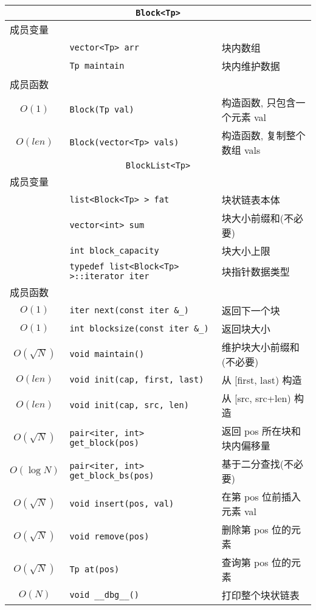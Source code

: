 \begin{longtable}{c|l|l}
\multicolumn{3}{c}{{\tt Block<Tp>}} \\ \hline\hline
\multicolumn{3}{l}{成员变量} \\ \hline
& \verb`vector<Tp> arr` & 块内数组 \\
& \verb`Tp maintain` & 块内维护数据 \\
\hline
\multicolumn{3}{l}{成员函数} \\ \hline
$O(1)$ & \verb`Block(Tp val)` & 构造函数, 只包含一个元素 val \\
$O(len)$ & \verb`Block(vector<Tp> vals)` & 构造函数, 复制整个数组 vals \\
\hline\hline
\multicolumn{3}{c}{{\tt BlockList<Tp>}}\\ \hline\hline
\multicolumn{3}{l}{成员变量} \\ \hline
& \verb`list<Block<Tp> > fat` & 块状链表本体 \\
& \verb`vector<int> sum` & 块大小前缀和(不必要) \\
& \verb`int block_capacity` & 块大小上限 \\
& \verb`typedef list<Block<Tp> >::iterator iter` & 块指针数据类型 \\
\hline
\multicolumn{3}{l}{成员函数} \\ \hline
$O(1)$ & \verb`iter next(const iter &_)` & 返回下一个块 \\
$O(1)$ & \verb`int blocksize(const iter &_) ` & 返回块大小 \\
$O(\sqrt{N})$ & \verb`void maintain()` & 维护块大小前缀和(不必要) \\
$O(len)$ & \verb`void init(cap, first, last)` & 从 [first, last) 构造 \\
$O(len)$ & \verb`void init(cap, src, len)` & 从 [src, src+len) 构造 \\
$O(\sqrt{N})$ & \verb`pair<iter, int> get_block(pos)` & 返回 pos 所在块和块内偏移量 \\
$O(\log N)$ & \verb`pair<iter, int> get_block_bs(pos)` & 基于二分查找(不必要) \\
$O(\sqrt{N})$ & \verb`void insert(pos, val)` & 在第 pos 位前插入元素 val \\
$O(\sqrt{N})$ & \verb`void remove(pos)` & 删除第 pos 位的元素 \\
$O(\sqrt{N})$ & \verb`Tp at(pos)` & 查询第 pos 位的元素 \\
$O(N)$ & \verb`void __dbg__()` & 打印整个块状链表 \\
\hline\hline
\end{longtable}

